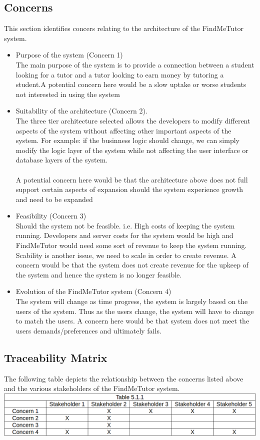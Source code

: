 \documentclass[12pt]{article}
\begin{document}
\subsection{Concerns}
This section identifies concers relating to the architecture of the FindMeTutor system.
\begin{itemize}
\item Purpose of the system (Concern 1)\\
The main purpose of the system is to provide a connection between a student looking for a tutor and a tutor looking to earn money by tutoring a student.A potential concern here would be a slow uptake or worse students not interested in using the system\\
\item Suitability of the architecture (Concern 2).\\
The three tier architecture selected allows the developers to modify different aspects of the system without affecting other important aspects of the system. For example: if the businness logic should change, we can simply modify the logic layer of the system while not affecting the user interface or database layers of the system.\\\\A potential concern here would be that the architecture above does not full support certain aspects of expansion should the system experience growth and need to be expanded
\item Feasibility (Concern 3)\\
Should the system not be feasible. i.e. High costs of keeping the system running. Developers and server costs for the system would be high and FindMeTutor would need some sort of revenue to keep the system running. Scability is another issue, we need to scale in order to create revenue. A concern would be that the system does not create revenue for the upkeep of the system and hence the system is no longer feasible.
\item Evolution of the FindMeTutor system (Concern 4)\\
The system will change as time progress, the system is largely based on the users of the system. Thus as the users change, the system will have to change to match the users. A concern here would be that system does not meet the users demands/preferences and ultimately fails.
\end{itemize}

\subsection{Traceability Matrix}
The following table depicts the relationship between the concerns listed above and the various stakeholders of the FindMeTutor system.\\
\includegraphics[width=140mm]{./trace.png}
\end{document}
